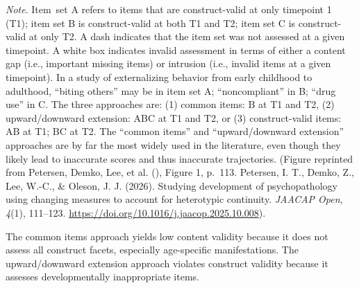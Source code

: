 \documentclass[
  american,
  letterpaper,
  12pt]{article}
\newenvironment{apafloatnote}
  {\par\setlength{\parindent}{0pt}\noindent}
  {\par}
\begin{document}
\begin{apafloatnote}

\emph{Note}. Item~set A refers to items that are construct-valid at only
timepoint 1 (T1); item set B is construct-valid at both T1 and T2; item
set C is construct-valid at only T2. A dash indicates that the item set
was not assessed at a given timepoint. A white box indicates invalid
assessment in terms of either a content gap (i.e., important missing
items) or intrusion (i.e., invalid items at a given timepoint). In a
study of externalizing behavior from early childhood to adulthood,
``biting others'' may be in item set A; ``noncompliant'' in B; ``drug
use'' in C. The three approaches are: (1) common items: B at T1 and T2,
(2) upward/downward extension: ABC at T1 and T2, or (3) construct-valid
items: AB at T1; BC at T2. The ``common items'' and ``upward/downward
extension'' approaches are by far the most widely used in the
literature, even though they likely lead to inaccurate scores and thus
inaccurate trajectories. (Figure reprinted from Petersen, Demko, Lee, et
al. (), Figure 1, p.~113. Petersen, I.
T., Demko, Z., Lee, W.-C., \& Oleson, J. J. (2026). Studying development
of psychopathology using changing measures to account for heterotypic
continuity. \emph{JAACAP Open}, \emph{4}(1), 111--123.
\url{https://doi.org/10.1016/j.jaacop.2025.10.008}).

\end{apafloatnote}

\par\endgroup\addvspace{\baselineskip}

The common items approach yields low content validity because it does
not assess all construct facets, especially age-specific manifestations.
The upward/downward extension approach violates construct validity
because it assesses developmentally inappropriate items.
\end{document}
